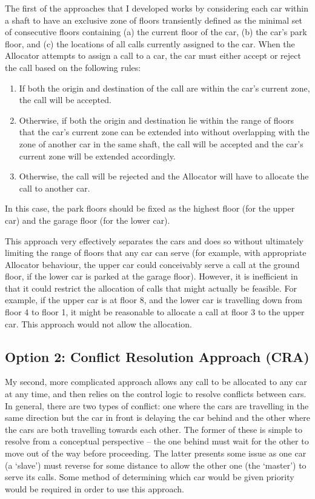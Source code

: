 \documentclass{UoYCSproject}
\begin{document}
The first of the approaches that I developed works by considering each car within a shaft to have an exclusive zone of floors transiently defined as the minimal set of consecutive floors containing (a) the current floor of the car, (b) the car's park floor, and (c) the locations of all calls currently assigned to the car.  When the Allocator attempts to assign a call to a car, the car must either accept or reject the call based on the following rules:
	\begin{enumerate}
		\item If both the origin and destination of the call are within the car's current zone, the call will be accepted.
		\item Otherwise, if both the origin and destination lie within the range of floors that the car's current zone can be extended into without overlapping with the zone of another car in the same shaft, the call will be accepted and the car's current zone will be extended accordingly.
		\item Otherwise, the call will be rejected and the Allocator will have to allocate the call to another car.
	\end{enumerate}

In this case, the park floors should be fixed as the highest floor (for the upper car) and the garage floor (for the lower car).

This approach very effectively separates the cars and does so without ultimately limiting the range of floors that any car can serve (for example, with appropriate Allocator behaviour, the upper car could conceivably serve a call at the ground floor, if the lower car is parked at the garage floor).  However, it is inefficient in that it could restrict the allocation of calls that might actually be feasible.  For example, if the upper car is at floor 8, and the lower car is travelling down from floor 4 to floor 1, it might be reasonable to allocate a call at floor 3 to the upper car.  This approach would not allow the allocation.

\subsection{Option 2: Conflict Resolution Approach (CRA)}

My second, more complicated approach allows any call to be allocated to any car at any time, and then relies on the control logic to resolve conflicts between cars.  In general, there are two types of conflict: one where the cars are travelling in the same direction but the car in front is delaying the car behind and the other where the cars are both travelling towards each other.  The former of these is simple to resolve from a conceptual perspective -- the one behind must wait for the other to move out of the way before proceeding.  The latter presents some issue as one car (a `slave') must reverse for some distance to allow the other one (the `master') to serve its calls.  Some method of determining which car would be given priority would be required in order to use this approach.
\end{document}
